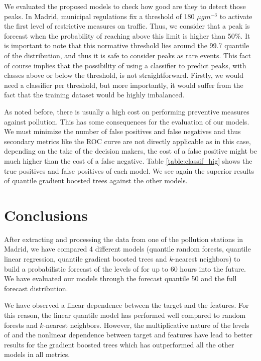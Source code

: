 \documentclass[a4paper,3p,sort&compress]{elsarticle}
\begin{document}
We evaluated the proposed models to check how good are they to detect
those peaks.  In Madrid, municipal regulations fix a threshold of 180
$\mu gm^{-3}$ to activate the first level of restrictive measures on
traffic. Thus, we consider that a \no peak is forecast when the
probability of reaching above this limit is higher than 50\%.  It is
important to note that this normative threshold lies around the 99.7
quantile of the \no distribution, and thus it is safe to consider
peaks as rare events.
This fact of course implies that the possibility of using a classifier
to predict peaks, with classes above or below the threshold, is not
straightforward. Firstly, we would need a classifier per threshold,
but more importantly, it would suffer from the fact that the training
dataset would be highly imbalanced.

As noted before, there is usually a high cost on performing preventive
measures against pollution. This has some consequences for the
evaluation of our models. We must minimize the number of false
positives and false negatives and thus secondary metrics like the ROC
curve are not directly applicable as in this case, depending on the
take of the decision makers, the cost of a false positive might be
much higher than the cost of a false negative. Table
\ref{table:classif_hig} shows the true positives and false positives
of each model. We see again the superior results of quantile gradient
boosted trees against the other models.


\section{Conclusions}
\label{sec:concl}

After extracting and processing the data from one of the pollution
stations in Madrid, we have compared 4 different models (quantile
random forests, quantile linear regression, quantile gradient boosted
trees and $k$-nearest neighbors) to build a probabilistic forecast of
the levels of \no for up to 60 hours into the future. We have
evaluated our models through the forecast quantile 50 and the full
forecast distribution.

We have observed a linear dependence between the target and the
features. For this reason, the linear quantile model has performed
well compared to random forests and $k$-nearest neighbors. However,
the multiplicative nature of the levels of \no and the nonlinear
dependence between target and features have lead to better results for
the gradient boosted trees which has outperformed all the other models
in all metrics.
\end{document}
